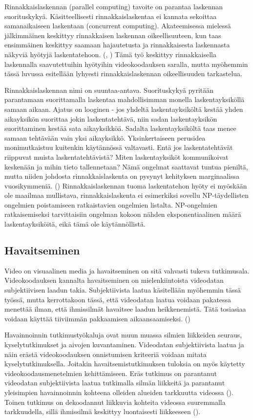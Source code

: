 Rinnakkaislaskennan (parallel computing) tavoite on parantaa laskennan
suorituskykyä. Käsitteellisesti rinnakkaislaskentaa ei kannata sekoittaa
samanaikaiseen laskentaan (concurrent computing). Akateemisessa mielessä
jälkimmäinen keskittyy rinnakkaisen laskennan oikeellisuuteen, kun taas
ensimmäinen keskittyy saamaan hajautetusta ja rinnakkaisesta laskennasta
näkyviä hyötyjä laskentatehoon. (\citealt{intro}, \citealt{ari}) Tämä työ keskittyy
rinnakkaisella laskennalla saavutettuihin hyötyihin videokoodauksen saralla,
mutta myöhemmin tässä luvussa esitellään lyhyesti rinnakkaislaskennan
oikeellisuuden tarkastelua.

Rinnakkaislaskennan nimi on suuntaa-antava. Suorituskykyä pyritään parantamaan
suorittamalla laskentaa mahdollisimman monella laskentayksiköllä samaan aikaan.
Ajatus on looginen - jos yhdeltä laskentayksiköltä kestää yhden aikayksikön
suorittaa jokin laskentatehtävä, niin sadan laskentayksikön suorittaminen
kestää sata aikayksikköä. Sadalta laskentayksiköltä taas menee samaan tehtävään
vain yksi aikayksikkö. Yksinkertaiseen perusidea monimutkaistuu kuitenkin
käytännössä valtavasti. Entä jos laskentatehtävät riippuvat muista
laskentatehtävistä? Miten laskentayksiköt kommunikoivat keskenään ja mihin
tieto tallennetaan? Nämä ongelmat saattavat tuntua pieniltä, mutta niiden
johdosta rinnakkaislaskenta on pysynyt kehityksen marginaalissa vuosikymmeniä.
(\citealt{intro}) Rinnakkaislaskennan tuoma laskentatehon hyöty ei myöskään ole
maailmaa mullistava, rinnakkaislaskenta ei esimerkiksi sovellu NP-täydellisten
ongelmien poistamiseen ratkaistavien ongelmien listalta. NP-ongelmien
ratkaisemiseksi tarvittaisiin ongelman kokoon nähden eksponentiaalinen määrä
laskentayksiköitä, eikä tämä ole käytännöllistä.

\subsection{Havaitseminen}

Video on visuaalinen media ja havaitseminen on sitä vahvasti tukeva
tutkimusala. Videokoodauksen kannalta havaitseminen on mielenkiintoista
videodatan subjektiivisen laadun takia. Subjektiivista laatua käsitellään
myöhemmin tässä työssä, mutta kerrottakoon tässä, että videodatan laatua
voidaan pakatessa menettää ilman, että ihmissilmät havaitsee laadun
heikkenemistä. Tätä tosiasiaa voidaan käyttää tiiviimmän pakkaamisen
aikaansaamiseksi. (\cite{h264})

Havainnoinnin tutkimustyökaluja ovat muun muassa silmien liikkeiden seuraus,
kyselytutkimukset ja aivojen kuvantaminen. Videodatan subjektiivista laatua
ja näin erästä videokoodauksen onnistumisen kriteeriä voidaan mitata
kyselytutkimuksella. Joitakin havaitsemistutkimuksen tuloksia on myös käytetty
videokoodausmenetelmien kehittämiseen. Eräs tutkimus on parantanut videodatan
subjektiivista laatua tutkimalla silmän liikkeitä ja parantanut yleisimpien
havainnoinnin kohteena olleiden alueiden tarkkuutta videossa
(\citealt{perception}). Toinen tutkimus on dekoodannut liikkuvia kohteita
videossa suuremmalla tarkkuudella, sillä ihmissilmä keskittyy luontaisesti
liikkeeseen (\citealt{lee}).

